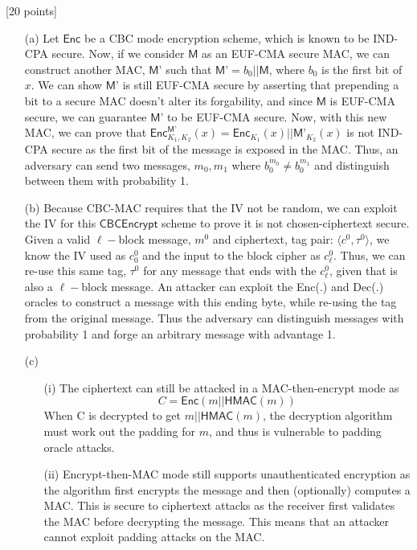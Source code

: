 \documentclass[11pt]{article}
\newcounter{qnum}
\newcommand{\question}[1]{\stepcounter{qnum}\bigskip\noindent{\bf \arabic{qnum}. #1.}}
\newcommand{\enc}{\textsf{Enc}}
\begin{document}
\question{MACs and Encryption} [20 points] 
\begin{itemize}
  \item[(a)] Let $\textsf{Enc}$ be a CBC mode encryption scheme, which is known
    to be IND-CPA secure. Now, if we consider $\textsf{M}$ as an EUF-CMA secure MAC, we can
    construct another MAC, $\textsf{M'}$ such that $\textsf{M'} = b_0 || \textsf{M}$, where 
    $b_0$ is the first bit of $x$. We can show $\textsf{M'}$ is still EUF-CMA secure by asserting
    that prepending a bit to a secure MAC doesn't alter its forgability, and since $\textsf{M}$ is
    EUF-CMA secure, we can guarantee $\textsf{M'}$ to be EUF-CMA secure. Now, with this new MAC, 
    we can prove that $\enc^{\textsf{M'}}_{K_1,K_2}(x) =\enc_{K_1}(x)||  \textsf{M'}_{K_2}(x)$  
    is not IND-CPA secure as the first bit of the message is exposed in the MAC. Thus, an adversary
    can send two messages, $m_0, m_1$ where $b^{m_0}_0 \neq b^{m_1}_0$ and distinguish between them
    with probability 1.
\item[(b)] Because CBC-MAC requires that the IV not be random, we can exploit the IV 
for this $\textsf{CBCEncrypt}$ scheme to prove it is not chosen-ciphertext secure. Given a valid
$\ell-$block message, $m^0$ and ciphertext, tag pair: $\langle c^0, \tau^0 \rangle$,
we know the IV used as $c^0_0$ and the input to the block cipher as $c^0_\ell$. Thus, we can 
re-use this same tag, $\tau^0$ for any message that ends with the $c^0_\ell$, given that is 
also a $\ell-$block message. An attacker can exploit the \textsf{Enc}(.) and \textsf{Dec}(.)
oracles to construct a message with this ending byte, while re-using the tag from the original
message. Thus the adversary can distinguish messages with probability 1 and forge an arbitrary
message with advantage 1.
\item[(c)]
  \begin{itemize}
    \item[(i)]
      The ciphertext can still be attacked in a MAC-then-encrypt mode as 
      $$C = \textsf{Enc}(m||\textsf{HMAC}(m))$$
      When C is decrypted to get $m||\textsf{HMAC}(m)$, the decryption algorithm must work
      out the padding for $m$, and thus is vulnerable to padding oracle attacks.
    \item[(ii)]
      Encrypt-then-MAC mode still supports unauthenticated encryption as the algorithm
      first encrypts the message and then (optionally) computes a MAC.  This is secure to 
      ciphertext attacks as the receiver first validates the MAC before decrypting the message. 
      This means that an attacker cannot exploit padding attacks on the MAC.

  \end{itemize}

\end{itemize}
\end{document}
